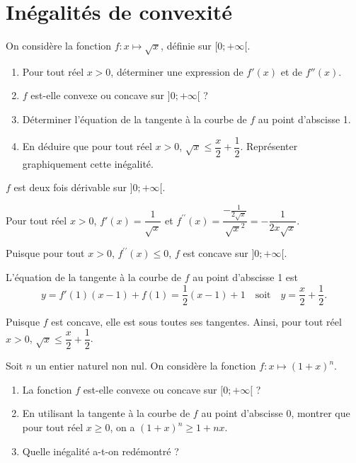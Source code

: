 \documentclass[11pt,fleqn, openany]{book} %
\begin{document}
 
\section*{Inégalités de convexité}

\begin{exercise}On considère la fonction $f:x\mapsto \sqrt{x}$, définie sur $[0;+\infty [$.
\begin{enumerate}
\item Pour tout réel $x>0$, déterminer une expression de $f'(x)$ et de $f''(x)$.
\item $f$ est-elle convexe ou concave sur $]0;+\infty[$ ?
\item Déterminer l'équation de la tangente à la courbe de $f$ au point d'abscisse 1.
\item En déduire que pour tout réel $x>0$, $\sqrt{x} \leqslant \dfrac{x}{2}+\dfrac{1}{2}$. Représenter graphiquement cette inégalité.
\end{enumerate}\end{exercise}

\begin{solution}
\(f\) est deux fois dérivable sur \(]0;+\infty [\).

Pour tout réel \(x>0\), \(f'(x)=\dfrac{1}{\sqrt{x}}\) et $f^{\prime\prime}(x)=\dfrac{-\frac{1}{2\sqrt{x}}}{\sqrt{x}^2}=-\dfrac{1}{2x\sqrt{x}}$.

Puisque pour tout \(x>0\), \(f^{\prime\prime}(x)\leqslant 0\), \(f\) est concave sur \(]0;+\infty[\).

L'équation de la tangente à la courbe de \(f\) au point d'abscisse 1 est
\[ y=f'(1)(x-1)+f(1)=\dfrac{1}{2}(x-1)+1\quad\text{soit}\quad y=\dfrac{x}{2}+\dfrac{1}{2}.\]

 Puisque \(f\) est concave, elle est sous toutes ses tangentes. Ainsi, pour tout réel \(x>0\), \(\sqrt{x} \leqslant \dfrac{x}{2}+\dfrac{1}{2}\).
\end{solution}




\begin{exercise}Soit $n$ un entier naturel non nul. On considère la fonction $f:x\mapsto (1+x)^n$.
\begin{enumerate}
\item La fonction $f$ est-elle convexe ou concave sur $[0;+\infty[$ ?
\item En utilisant la tangente à la courbe de $f$ au point d'abscisse 0, montrer que pour tout réel $x\geqslant 0$,  on a $(1+x)^n \geqslant 1+nx$.
\item Quelle inégalité a-t-on redémontré ?
\end{enumerate}\end{exercise}
\end{document}
